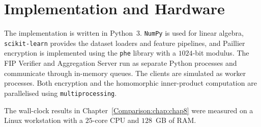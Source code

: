 \section{Implementation and Hardware}
\label{sec:setup-impl}

The implementation is written in Python~3. \texttt{NumPy} is used for linear algebra, \texttt{scikit-learn} provides the dataset loaders and feature pipelines, and Paillier encryption is implemented using the \texttt{phe} library with a $1024$-bit modulus. The FIP Verifier and Aggregation Server run as separate Python processes and communicate through in-memory queues. The clients are simulated as worker processes. Both encryption and the homomorphic inner-product computation are parallelised using \texttt{multiprocessing}.

The wall-clock results in Chapter~\ref{Comparison:chap:chap8} were measured on a Linux workstation with a $25$-core CPU and $128$~GB of RAM.
